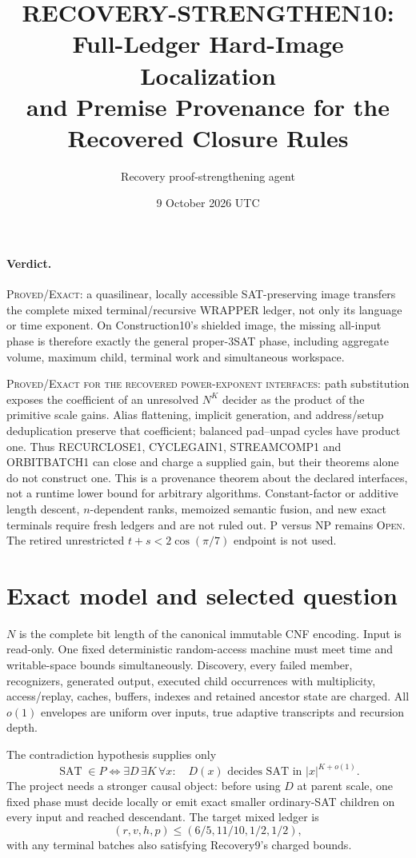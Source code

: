 \documentclass[11pt]{article}
\title{RECOVERY-STRENGTHEN10: Full-Ledger Hard-Image Localization\\and Premise Provenance for the Recovered Closure Rules}
\author{Recovery proof-strengthening agent}
\date{9 October 2026 UTC}
\newcommand{\SAT}{\operatorname{SAT}}
\begin{document}
\sloppy\maketitle

\paragraph{Verdict.}
\textsc{Proved/Exact}: a quasilinear, locally accessible SAT-preserving image
transfers the complete mixed terminal/recursive WRAPPER ledger, not only its
language or time exponent.  On Construction10's shielded image, the missing
all-input phase is therefore exactly the general proper-3SAT phase, including
aggregate volume, maximum child, terminal work and simultaneous workspace.

\textsc{Proved/Exact for the recovered power-exponent interfaces}: path
substitution exposes the coefficient of an unresolved $N^K$ decider as the
product of the primitive scale gains.  Alias flattening, implicit generation,
and address/setup deduplication preserve that coefficient; balanced
pad--unpad cycles have product one.  Thus RECURCLOSE1, CYCLEGAIN1,
STREAMCOMP1 and ORBITBATCH1 can close and charge a supplied gain, but their
theorems alone do not construct one.  This is a provenance theorem about the
declared interfaces, not a runtime lower bound for arbitrary algorithms.
Constant-factor or additive length descent, $n$-dependent ranks, memoized
semantic fusion, and new exact terminals require fresh ledgers and are not
ruled out.  P versus NP remains \textsc{Open}.  The retired unrestricted
$t+s<2\cos(\pi/7)$ endpoint is not used.

\section{Exact model and selected question}

$N$ is the complete bit length of the canonical immutable CNF encoding.
Input is read-only.  One fixed deterministic random-access machine must meet
time and writable-space bounds simultaneously.  Discovery, every failed
member, recognizers, generated output, executed child occurrences with
multiplicity, access/replay, caches, buffers, indexes and retained ancestor
state are charged.  All $o(1)$ envelopes are uniform over inputs, true
adaptive transcripts and recursion depth.

The contradiction hypothesis supplies only
\[
 \SAT\in P\iff \exists D\,\exists K\,\forall x:\quad
 D(x)\text{ decides SAT in }|x|^{K+o(1)}.              \tag{1}
\]
The project needs a stronger causal object: before using $D$ at parent scale,
one fixed phase must decide locally or emit exact smaller ordinary-SAT
children on every input and reached descendant.  The target mixed ledger is
\[
 (r,v,h,p)\le(6/5,11/10,1/2,1/2),                    \tag{2}
\]
with any terminal batches also satisfying Recovery9's charged bounds.
\end{document}

